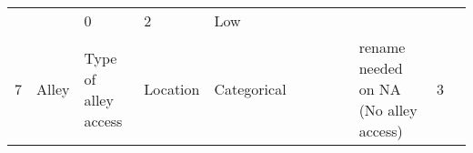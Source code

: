 \documentclass[11pt]{article}
\begin{document}
\begin{longtable}[]{@{}llllllllllll@{}}
\begin{minipage}[t]{0.04\columnwidth}
\strut
\end{minipage} & \begin{minipage}[t]{0.04\columnwidth}\raggedright\strut
\strut
\end{minipage} & \begin{minipage}[t]{0.04\columnwidth}\raggedright\strut
0\strut
\end{minipage} & \begin{minipage}[t]{0.04\columnwidth}\raggedright\strut
2\strut
\end{minipage} & \begin{minipage}[t]{0.04\columnwidth}\raggedright\strut
Low\strut
\end{minipage}\tabularnewline
\begin{minipage}[t]{0.04\columnwidth}\raggedright\strut
7\strut
\end{minipage} & \begin{minipage}[t]{0.04\columnwidth}\raggedright\strut
Alley\strut
\end{minipage} & \begin{minipage}[t]{0.04\columnwidth}\raggedright\strut
Type of alley access\strut
\end{minipage} & \begin{minipage}[t]{0.04\columnwidth}\raggedright\strut
Location\strut
\end{minipage} & \begin{minipage}[t]{0.04\columnwidth}\raggedright\strut
Categorical\strut
\end{minipage} & \begin{minipage}[t]{0.04\columnwidth}\raggedright\strut
\strut
\end{minipage} & \begin{minipage}[t]{0.04\columnwidth}\raggedright\strut
\strut
\end{minipage} & \begin{minipage}[t]{0.04\columnwidth}\raggedright\strut
\strut
\end{minipage} & \begin{minipage}[t]{0.04\columnwidth}\raggedright\strut
\strut
\end{minipage} & \begin{minipage}[t]{0.04\columnwidth}\raggedright\strut
rename needed on NA (No alley access)\strut
\end{minipage} & \begin{minipage}[t]{0.04\columnwidth}\raggedright\strut
3\strut
\end{minipage} & \begin{minipage}[t]{0.04\columnwidth}\raggedright\strut

\end{minipage}
\end{longtable}
\end{document}
